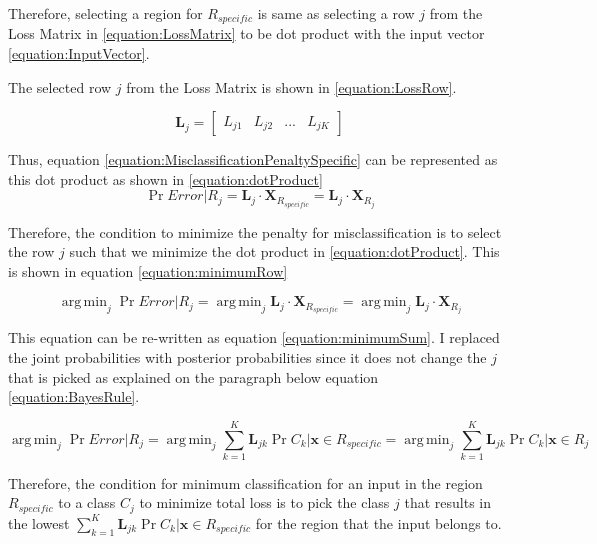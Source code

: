 \documentclass[a4paper,12pt]{article}
\DeclareMathOperator*{\argmin}{arg\,min}
\begin{document}
Therefore, selecting a region for $R_{specific}$ is same as selecting a row $j$ from the Loss Matrix in \ref{equation:LossMatrix} to be dot product with the input vector \ref{equation:InputVector}.

The selected row $j$ from the Loss Matrix is shown in \ref{equation:LossRow}. 

\begin{equation}
\label{equation:LossRow}
\mathbf{L}_{j} =
  \begin{bmatrix}
    L_{j1} & L_{j2} & ... & L_{jK}
  \end{bmatrix}
\end{equation}

Thus, equation \ref{equation:MisclassificationPenaltySpecific} can be represented as this dot product as shown in \ref{equation:dotProduct}
\begin{equation}
\label{equation:dotProduct}
\Pr{Error | R_{j}} = \mathbf{L}_{j} \cdot \mathbf{X}_{R_{specific}} = \mathbf{L}_{j} \cdot \mathbf{X}_{R_{j}}
\end{equation}

Therefore, the condition to minimize the penalty for misclassification is to select the row $j$ such that we minimize the dot product in \ref{equation:dotProduct}. 
This is shown in equation \ref{equation:minimumRow}

\begin{equation}
\label{equation:minimumRow}
 \argmin_j \Pr{Error | R_{j}} = \argmin_j \mathbf{L}_{j} \cdot \mathbf{X}_{R_{specific}} =  \argmin_j \mathbf{L}_{j} \cdot \mathbf{X}_{R_{j}}
\end{equation}

This equation can be re-written as equation \ref{equation:minimumSum}. I replaced the joint probabilities with posterior probabilities since it does not change the $j$ that is picked as explained on the paragraph below equation \ref{equation:BayesRule}. 

\begin{equation}
\label{equation:minimumSum}
 \argmin_j \Pr{Error | R_{j}} =  \argmin_j \sum_{k=1}^{K} \mathbf{L}_{jk} \Pr{C_{k} | \mathbf{x} \in R_{specific}} =  \argmin_j \sum_{k=1}^{K} \mathbf{L}_{jk} \Pr{C_{k} | \mathbf{x} \in R_{j}}
\end{equation}

Therefore, the condition for minimum classification for an input in the region $R_{specific}$ to a class $C_{j}$ to minimize total loss is to pick the class $j$ that results in the lowest $\sum_{k=1}^{K} \mathbf{L}_{jk} \Pr{C_{k} | \mathbf{x} \in R_{specific}}$ for the region that the input belongs to. 
\end{document}
